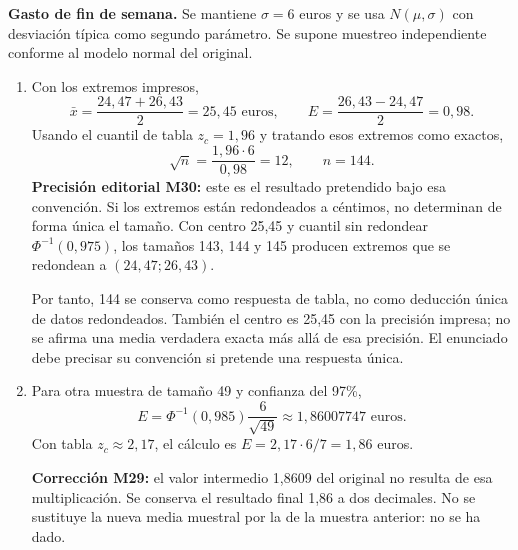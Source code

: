 \documentclass[11pt]{article}
\begin{document}
\textbf{Gasto de fin de semana.} Se mantiene $\sigma=6$ euros y se usa $N(\mu,\sigma)$ con desviación típica como segundo parámetro. Se supone muestreo independiente conforme al modelo normal del original.
\begin{enumerate}[label=(\alph*)]
\item Con los extremos impresos,
\[
\bar x=\frac{24,47+26,43}{2}=\boxed{25,45\text{ euros}},\qquad E=\frac{26,43-24,47}{2}=0,98.
\]
Usando el cuantil de tabla $z_c=1,96$ y tratando esos extremos como exactos,
\[
\sqrt n=\frac{1,96\cdot6}{0,98}=12,\qquad\boxed{n=144}.
\]
\textbf{Precisión editorial M30:} este es el resultado pretendido bajo esa convención. Si los extremos están redondeados a céntimos, no determinan de forma única el tamaño. Con centro 25,45 y cuantil sin redondear $\Phi^{-1}(0,975)$, los tamaños 143, 144 y 145 producen extremos que se redondean a $(24,47;26,43)$.

Por tanto, 144 se conserva como respuesta de tabla, no como deducción única de datos redondeados. También el centro es 25,45 con la precisión impresa; no se afirma una media verdadera exacta más allá de esa precisión. El enunciado debe precisar su convención si pretende una respuesta única.
\item Para otra muestra de tamaño 49 y confianza del 97\%,
\[
E=\Phi^{-1}(0,985)\frac6{\sqrt{49}}\approx\boxed{1,86007747\text{ euros}}.
\]
Con tabla $z_c\approx2,17$, el cálculo es $E=2,17\cdot6/7=1,86$ euros.

\textbf{Corrección M29:} el valor intermedio 1,8609 del original no resulta de esa multiplicación. Se conserva el resultado final 1,86 a dos decimales. No se sustituye la nueva media muestral por la de la muestra anterior: no se ha dado.
\end{enumerate}
\end{document}
